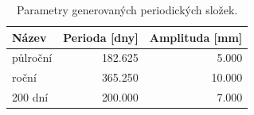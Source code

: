 \begin{table}[H]
\centering
\caption{Parametry generovaných periodických složek.}
\label{tab:known_periodicities}
\begin{tabular}{lrr}
\toprule
Název & Perioda [dny] & Amplituda [mm] \\
\midrule
půlroční & 182.625 & 5.000 \\
roční & 365.250 & 10.000 \\
200 dní & 200.000 & 7.000 \\
\bottomrule
\end{tabular}
\end{table}
